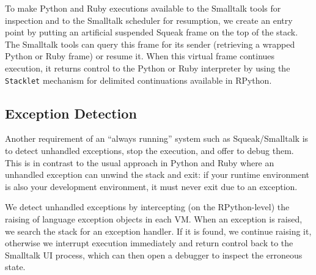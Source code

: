 \documentclass[10pt,numbers]{sigplanconf}
\begin{document}
To make Python and Ruby executions available to the Smalltalk tools for
inspection and to the Smalltalk scheduler for resumption, we create an entry
point by putting an artificial suspended Squeak frame on the top of the
stack. The Smalltalk tools can query this frame for its sender (retrieving a
wrapped Python or Ruby frame) or resume it. When this virtual frame continues
execution, it returns control to the Python or Ruby interpreter by using the
\texttt{Stacklet} mechanism for delimited continuations available in RPython.


\subsection{Exception Detection}

Another requirement of an ``always running'' system such as Squeak/Smalltalk is
to detect unhandled exceptions, stop the execution, and offer to debug
them. This is in contrast to the usual approach in Python and Ruby where an
unhandled exception can unwind the stack and exit: if your runtime environment
is also your development environment, it must never exit due to an exception.

We detect unhandled exceptions by intercepting (on the RPython-level) the
raising of language exception objects in each VM. When an exception is raised,
we search the stack for an exception handler. If it is found, we continue
raising it, otherwise we interrupt execution immediately and return control back
to the Smalltalk UI process, which can then open a debugger to inspect the
erroneous state.

\end{document}
